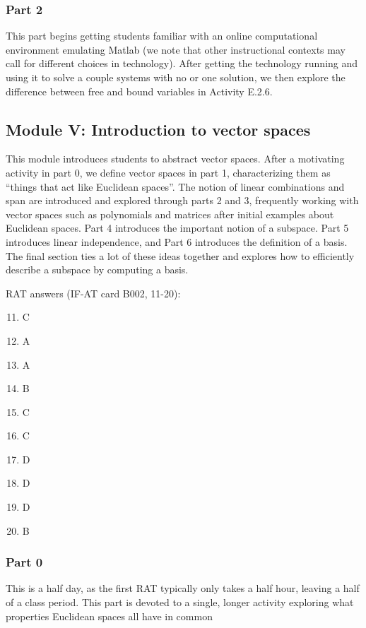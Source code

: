 \documentclass{article}
\begin{document}
\subsubsection*{Part 2}
This part begins getting students familiar with an online computational environment emulating Matlab (we note that other instructional contexts may call for different choices in technology).  After getting the technology running and using it to solve a couple systems with no or one solution, we then explore the difference between free and bound variables in Activity E.2.6.


\subsection*{Module V: Introduction to vector spaces}
This module introduces students to abstract vector spaces.  After a motivating activity in part 0, we define vector spaces in part 1, characterizing them as ``things that act like Euclidean spaces''.  The notion of linear combinations and span are introduced and explored through parts 2 and 3, frequently working with vector spaces such as polynomials and matrices after initial examples about Euclidean spaces.  Part 4 introduces the important notion of a subspace.  Part 5 introduces linear independence, and Part 6 introduces the definition of a basis.  The final section ties a lot of these ideas together and explores how to efficiently describe a subspace by computing a basis.

RAT answers (IF-AT card B002, 11-20):
\begin{multicols}{10}
\begin{enumerate}[1)]
\setcounter{enumi}{10}
\item C
\item A
\item A
\item B
\item C
\item C
\item D
\item D
\item D
\item B
\end{enumerate}
\end{multicols}

\subsubsection*{Part 0}
This is a half day, as the first RAT typically only takes a half hour, leaving a half of a class period.  This part is devoted to a single, longer activity exploring what properties Euclidean spaces all have in common
\end{document}
